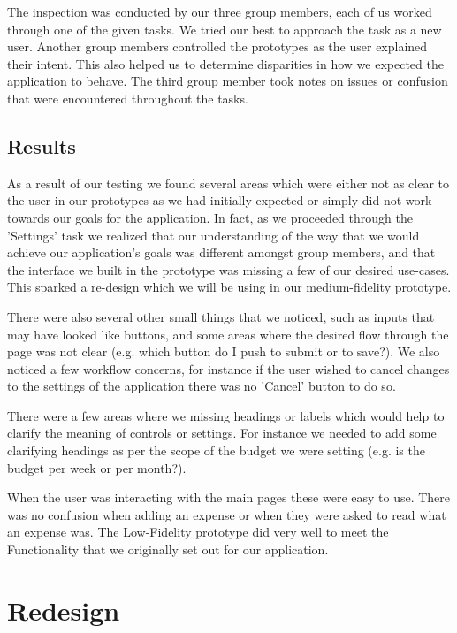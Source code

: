 \documentclass{chi2011}
\begin{document}
    The inspection was conducted by our three group members, each of us worked through one of the given tasks. We
    tried our best to approach the task as a new user. Another group members controlled the prototypes as the user
    explained their intent. This also helped us to determine disparities in how we expected the application to behave.
    The third group member took notes on issues or confusion that were encountered throughout the tasks.

    \subsection{Results} 
    
    As a result of our testing we found several areas which were either not
    as clear to the user in our prototypes as we had initially expected or
    simply did not work towards our goals for the application. In fact, as we
    proceeded through the 'Settings' task we realized that our understanding of
    the way that we would achieve our application's goals was different amongst
    group members, and that the interface we built in the prototype was missing
    a few of our desired use-cases. This sparked a re-design which we will be
    using in our medium-fidelity prototype.

    There were also several other small things that we noticed, such as inputs
    that may have looked like buttons, and some areas where the desired flow
    through the page was not clear (e.g. which button do I push to submit or to
    save?). We also noticed a few workflow concerns, for instance if the user
    wished to cancel changes to the settings of the application there was no
    'Cancel' button to do so.

    There were a few areas where we missing headings or labels which would help
    to clarify the meaning of controls or settings. For instance we needed to
    add some clarifying headings as per the scope of the budget we were setting
    (e.g. is the budget per week or per month?).

	When the user was interacting with the main pages these were easy to use.
	There was no confusion when adding an expense or when they were asked to
	read what an expense was. The Low-Fidelity prototype did very well to meet
	the Functionality that we originally set out for our application. 


\section{Redesign}
\end{document}
